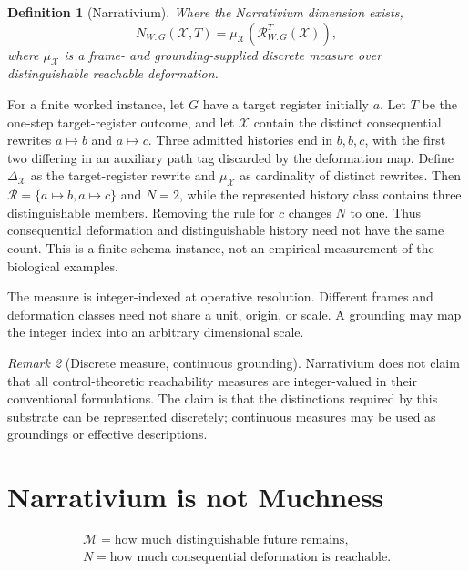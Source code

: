 \documentclass[11pt,a4paper]{article}
\newtheorem{definition}{Definition}[section]
\theoremstyle{remark}
\newtheorem{remark}[definition]{Remark}
\newcommand{\Much}{\mathcal M}
\begin{document}
\begin{definition}[Narrativium]\label{def:narrativium}
Where the Narrativium dimension exists,
\[
\boxed{
N_{W:G}(\mathcal X,T)
=
\mu_{\mathcal X}
\left(
\mathcal R_{W:G}^T(\mathcal X)
\right),
}
\]
where $\mu_{\mathcal X}$ is a frame- and grounding-supplied discrete measure over distinguishable reachable deformation.
\end{definition}
For a finite worked instance, let $G$ have a target register initially $a$.
Let $T$ be the one-step target-register outcome, and let $\mathcal X$
contain the distinct consequential rewrites $a\mapsto b$ and $a\mapsto c$.
Three admitted histories end in $b,b,c$, with the first two differing in an
auxiliary path tag discarded by the deformation map. Define
$\Delta_{\mathcal X}$ as the target-register rewrite and $\mu_{\mathcal X}$
as cardinality of distinct rewrites. Then
$\mathcal R=\{a\mapsto b,a\mapsto c\}$ and $N=2$, while the represented
history class contains three distinguishable members. Removing the rule for
$c$ changes $N$ to one. Thus consequential deformation and distinguishable
history need not have the same count. This is a finite schema instance,
not an empirical measurement of the biological examples.



The measure is integer-indexed at operative resolution. Different frames and deformation classes need not share a unit, origin, or scale. A grounding may map the integer index into an arbitrary dimensional scale.

\begin{remark}[Discrete measure, continuous grounding]\label{rem:discrete-measure}
Narrativium does not claim that all control-theoretic reachability measures are integer-valued in their conventional formulations. The claim is that the distinctions required by this substrate can be represented discretely; continuous measures may be used as groundings or effective descriptions.
\end{remark}

\section{Narrativium is not Muchness}\label{sec:not-muchness}

\[
\boxed{
\begin{array}{l}
\Much=\text{how much distinguishable future remains},\\[2pt]
N=\text{how much consequential deformation is reachable}.
\end{array}
}
\]
\end{document}
